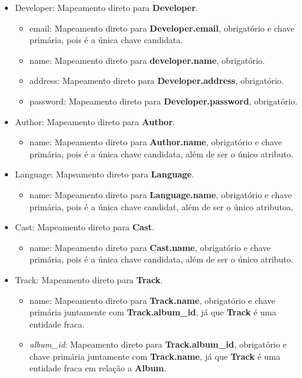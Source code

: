 \documentclass[a4paper, 11pt]{article}
\begin{document}
\begin{itemize}
\begin{itemize}
    \end{itemize}
    \item Developer: Mapeamento direto para {\textbf{Developer}}.
    \begin{itemize}
        \item email: Mapeamento direto para {\textbf{Developer.email}}, obrigatório e chave primária, pois é a única chave candidata.
        \item name: Mapeamento direto para {\textbf{developer.name}}, obrigatório.
        \item address: Mapeamento direto para {\textbf{Developer.address}}, obrigatório.
        \item password: Mapeamento direto para {\textbf{Developer.password}}, obrigatório.
    \end{itemize}
    \item Author: Mapeamento direto para {\textbf{Author}}.
    \begin{itemize}
        \item name: Mapeamento direto para {\textbf{Author.name}}, obrigatório e chave primária, pois é a única chave candidata, além de ser o único atributo.
    \end{itemize}
    \item Language: Mapeamento direto para {\textbf{Language}}.
    \begin{itemize}
        \item name: Mapeamento direto para {\textbf{Language.name}}, obrigatório e chave primária, pois é a única chave candidat, além de ser o único atributoa.
    \end{itemize}
    \item Cast: Mapeamento direto para {\textbf{Cast}}.
    \begin{itemize}
        \item name: Mapeamento direto para {\textbf{Cast.name}}, obrigatório e chave primária, pois é a única chave candidata, além de ser o único atributo.
    \end{itemize}
    \item Track: Mapeamento direto para {\textbf{Track}}.
    \begin{itemize}
        \item name: Mapeamento direto para {\textbf{Track.name}}, obrigatório e chave primária juntamente com \textbf{Track.album\_id}, já que \textbf{Track} é uma entidade fraca.
        \item \textit{album\_id}: Mapeamento direto para {\textbf{Track.album\_id}}, obrigatório e chave primária juntamente com \textbf{Track.name}, já que \textbf{Track} é uma entidade fraca em relação a \textbf{Album}.

\end{itemize}
\end{itemize}
\end{document}
